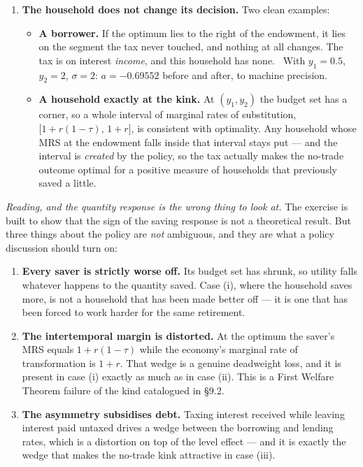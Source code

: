 \documentclass[12pt, letterpaper]{article}
\begin{document}
\begin{tcolorbox}[evenbox,title={Problem 6.6 \quad A Tax on Savings}]
\begin{enumerate}
\begin{enumerate}[label=(\roman*),leftmargin=1.9em,itemsep=5pt,topsep=4pt]
\item \textbf{The household does not change its decision.} Two clean examples:
      \begin{itemize}[leftmargin=1.2em,itemsep=2pt,topsep=2pt]
      \item \textbf{A borrower.} If the optimum lies to the right of the endowment, it lies
            on the segment the tax never touched, and nothing at all changes. The tax is on
            interest \emph{income}, and this household has none.
            \checkmark\ With $y_1=0.5$, $y_2=2$, $\sigma=2$: $a=-0.69552$ before and after,
            to machine precision.
      \item \textbf{A household exactly at the kink.} At $(y_1,y_2)$ the budget set has a
            corner, so a whole interval of marginal rates of substitution,
            $\bigl[1+r(1-\tau),\,1+r\bigr]$, is consistent with optimality. Any household
            whose MRS at the endowment falls inside that interval stays put --- and the
            interval is \emph{created} by the policy, so the tax actually makes the
            no-trade outcome optimal for a positive measure of households that previously
            saved a little.
      \end{itemize}
\end{enumerate}

\end{enumerate}

\smallskip
\emph{Reading, and the quantity response is the wrong thing to look at.} The exercise is
built to show that the sign of the saving response is not a theoretical result. But three
things about the policy are \emph{not} ambiguous, and they are what a policy discussion
should turn on:

\begin{enumerate}[label=\textbf{\arabic*.},leftmargin=1.6em,itemsep=3pt,topsep=3pt]
\item \textbf{Every saver is strictly worse off.} Its budget set has shrunk, so utility falls
      whatever happens to the quantity saved. Case (i), where the household saves more, is
      not a household that has been made better off --- it is one that has been forced to
      work harder for the same retirement.
\item \textbf{The intertemporal margin is distorted.} At the optimum the saver's MRS equals
      $1+r(1-\tau)$ while the economy's marginal rate of transformation is $1+r$. That wedge
      is a genuine deadweight loss, and it is present in case (i) exactly as much as in case
      (ii). This is a First Welfare Theorem failure of the kind catalogued in \S9.2.
\item \textbf{The asymmetry subsidises debt.} Taxing interest received while leaving interest
      paid untaxed drives a wedge between the borrowing and lending rates, which is a
      distortion on top of the level effect --- and it is exactly the wedge that makes the
      no-trade kink attractive in case (iii).
\end{enumerate}


\end{tcolorbox}
\end{document}
